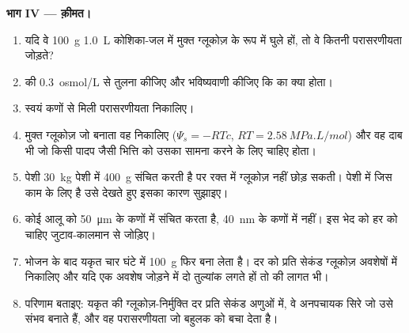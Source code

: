 \begin{problem}
\medskip
\noindent\textbf{भाग IV ---  क़ीमत।}
\begin{enumerate}[resume]
  \item यदि वे \qty{100}{g} \qty{1.0}{L} कोशिका-जल में मुक्त ग्लूकोज़
        के रूप में घुले हों, तो वे कितनी परासरणीयता जोड़ते?
  \item {} की \qty{0.3}{osmol/L} से तुलना कीजिए और भविष्यवाणी
        कीजिए कि  का क्या होता।
  \item स्वयं  कणों से मिली परासरणीयता निकालिए।
  \item मुक्त ग्लूकोज़ जो  बनाता वह निकालिए
        ($\Psi_s = -RTc$, $RT = \qty{2.58}{MPa.L/mol}$) और वह दाब भी जो
        किसी पादप जैसी भित्ति को उसका सामना करने के लिए चाहिए होता।
  \item पेशी \qty{30}{kg} पेशी में \qty{400}{g}  संचित करती है
        पर रक्त में ग्लूकोज़ नहीं छोड़ सकती। पेशी में  जिस काम
        के लिए है उसे देखते हुए इसका कारण सुझाइए।
  \item कोई आलू  को \qty{50}{\micro m} के कणों में संचित करता है,
        \qty{40}{nm} के  कणों में नहीं। इस भेद को हर  को
        चाहिए जुटाव-कालमान से जोड़िए।
  \item भोजन के बाद यकृत चार घंटे में \qty{100}{g}  फिर बना
        लेता है। दर को प्रति सेकंड ग्लूकोज़ अवशेषों में निकालिए और यदि
        एक अवशेष जोड़ने में दो  तुल्यांक लगते हों तो  की लागत भी।
  \item परिणाम बताइए: यकृत की ग्लूकोज़-निर्मुक्ति दर प्रति सेकंड अणुओं
        में, वे अनपचायक सिरे जो उसे संभव बनाते हैं, और वह परासरणीयता जो
        बहुलक  को बचा देता है।
\end{enumerate}
\end{problem}
